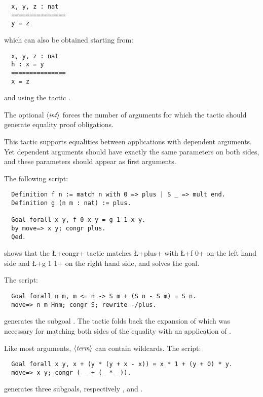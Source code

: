 \begin{lstlisting}
  x, y, z : nat
  ===============
  y = z
\end{lstlisting}
which can also be obtained starting from:
\begin{lstlisting}
  x, y, z : nat
  h : x = y
  ===============
  x = z
\end{lstlisting}
and using the tactic .

The optional $\langle\mbox{\itshape\rmfamily\small int}\rangle$ forces the number of arguments for which the
tactic should generate equality proof obligations.

This tactic supports equalities between applications with dependent
arguments. Yet dependent arguments should have exactly the same
parameters on both sides, and these parameters should appear as first
arguments.

The following script:
\begin{lstlisting}
  Definition f n := match n with 0 => plus | S _ => mult end.
  Definition g (n m : nat) := plus.

  Goal forall x y, f 0 x y = g 1 1 x y.
  by move=> x y; congr plus.
  Qed.
\end{lstlisting}
shows that the \L+congr+ tactic matches \L+plus+ with \L+f 0+ on the
left hand side and \L+g 1 1+ on the right hand side, and solves the goal.

The script:
\begin{lstlisting}
  Goal forall n m, m <= n -> S m + (S n - S m) = S n.
  move=> n m Hnm; congr S; rewrite -/plus.
\end{lstlisting}
generates the subgoal . The tactic
 folds back the expansion of  which was
necessary for matching both sides of the equality with an application
of .

Like most \ssr{} arguments, $\langle\mbox{\itshape\rmfamily\small term}\rangle$ can contain wildcards.
The script:
\begin{lstlisting}
  Goal forall x y, x + (y * (y + x - x)) = x * 1 + (y + 0) * y.
  move=> x y; congr ( _ + (_ * _)).
\end{lstlisting}
generates three subgoals, respectively , 
and .
